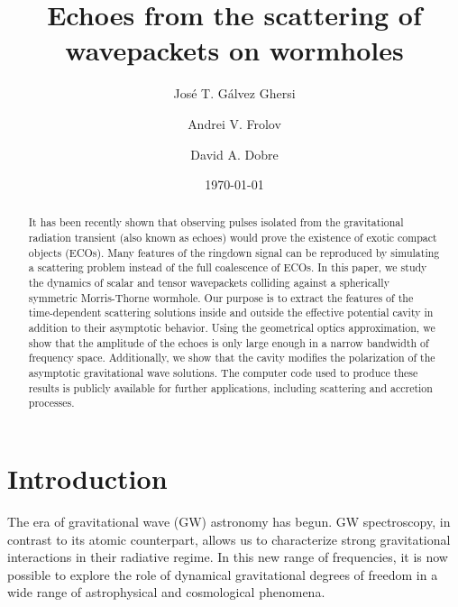 \documentclass[article,aps,nofootinbib,twocolumn,superscriptaddress]{revtex4-1}
\begin{document}
\title{Echoes from the scattering of wavepackets on wormholes}

\author{Jos\'e T. G\'alvez Ghersi}
\author{Andrei V. Frolov}
\author{David A. Dobre}
\date{\today}

\begin{abstract}
It has been recently shown that observing pulses isolated from the gravitational radiation transient (also known as echoes) would prove the existence of exotic compact objects (ECOs). Many features of the ringdown signal can be reproduced by simulating a scattering problem instead of the full coalescence of ECOs. In this paper, we study the dynamics of scalar and tensor wavepackets colliding against a spherically symmetric Morris-Thorne wormhole. Our purpose is to extract the features of the time-dependent scattering solutions inside and outside the effective potential cavity in addition to their asymptotic behavior. Using the geometrical optics approximation, we show that the amplitude of the echoes is only large enough in a narrow bandwidth of frequency space. Additionally, we show that the cavity modifies the polarization of the asymptotic gravitational wave solutions. The computer code used to produce these results is publicly available for further applications, including scattering and accretion processes.      
\end{abstract}

\maketitle


\section{Introduction}
The era of gravitational wave (GW) astronomy \citep{Abbott:2016blz, Abbott:2016nmj} has begun. GW spectroscopy, in contrast to its atomic counterpart, allows us to characterize strong gravitational interactions in their radiative regime. In this new range of frequencies, it is now possible to explore the role of dynamical gravitational degrees of freedom in a wide range of astrophysical \citep{Frolov:2017asg, Cardoso:2016rao} and cosmological \citep{Krauss989, Ade:2018gkx} phenomena. 
\end{document}

